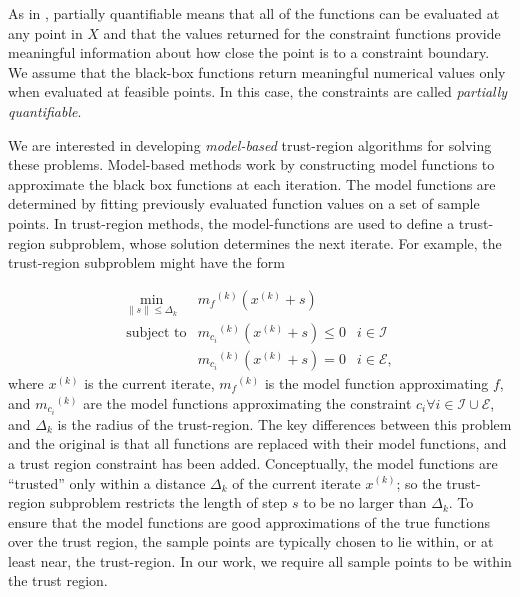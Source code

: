 \documentclass{article}
\theoremstyle{case}
\newcommand{\norm}[1]{\| #1 \|}
\newcommand{\union}{\cup}
\newcommand{\modelk}{{{m}_f}^{(k)}}
\newcommand{\modelconstrainti}{{{m}_{c_i}}^{(k)}}
\newcommand{\iteratek}{{x}^{(k)}}
\begin{document}
As in \cite{DUMMY:typesofconstraints}, partially quantifiable means that all of the functions can be evaluated at any point in $X$ and that the values returned for the constraint functions provide meaningful information about how close the point is to a constraint boundary.
We assume that the black-box functions return meaningful numerical values only when evaluated at feasible points. In this case, the constraints are called {\em partially quantifiable}.   

We are interested in developing {\em model-based} trust-region algorithms for solving these problems.
Model-based methods work by constructing model functions to approximate the black box functions at each iteration.
The model functions are determined by fitting previously evaluated function values on a set of sample points.
In trust-region methods, the model-functions are used to define a trust-region subproblem, whose solution determines the next iterate.
For example, the trust-region subproblem might have the form

\[ \begin{array}{ccl} \min_{\norm{s} \le \Delta_k}
 & \modelk (\iteratek+s) \\
\mbox{subject to} & \modelconstrainti(\iteratek + s) \le 0 & i \in \mathcal{I} \\
& \modelconstrainti(\iteratek + s) = 0 & i \in \mathcal{E},
\end{array}
\]
where $\iteratek$ is the current iterate, $\modelk$ is the model function approximating $f$,  and $\modelconstrainti$ are the model functions approximating the constraint $c_i \forall i \in \mathcal{I} \union \mathcal{E}$, and $\Delta_k$ is the radius of the trust-region.
The key differences between this problem and the original is that all functions are replaced with their model functions, and a trust region constraint has been added.
Conceptually, the model functions are ``trusted'' only within a distance $\Delta_k$ of the current iterate $\iteratek$; so the trust-region subproblem restricts the length of step $s$ to be no larger than $\Delta_k$.
To ensure that the model functions are good approximations of the true functions over the trust region, the sample points are typically chosen to lie within, or at least near, the trust-region.
In our work, we require all sample points to be within the trust region.
\end{document}
